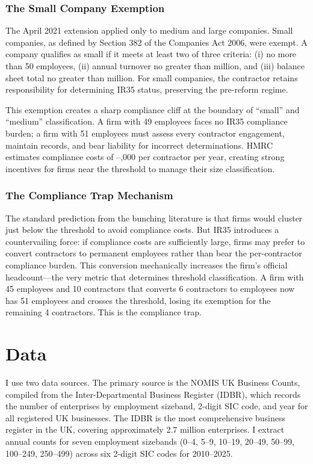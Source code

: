 \documentclass[12pt]{article}
\begin{document}
\subsubsection*{The Small Company Exemption} The April 2021 extension applied only to medium and large companies. Small companies, as defined by Section 382 of the Companies Act 2006, were exempt. A company qualifies as small if it meets at least two of three criteria: (i) no more than 50 employees, (ii) annual turnover no greater than  million, and (iii) balance sheet total no greater than  million. For small companies, the contractor retains responsibility for determining IR35 status, preserving the pre-reform regime.

This exemption creates a sharp compliance cliff at the boundary of ``small'' and ``medium'' classification. A firm with 49 employees faces no IR35 compliance burden; a firm with 51 employees must assess every contractor engagement, maintain records, and bear liability for incorrect determinations. HMRC estimates compliance costs of --,000 per contractor per year, creating strong incentives for firms near the threshold to manage their size classification.

\subsubsection*{The Compliance Trap Mechanism} The standard prediction from the bunching literature \citep{kleven2016bunching, saez2010taxpayers} is that firms would cluster just below the threshold to avoid compliance costs. But IR35 introduces a countervailing force: if compliance costs are sufficiently large, firms may prefer to convert contractors to permanent employees rather than bear the per-contractor compliance burden. This conversion mechanically increases the firm's official headcount---the very metric that determines threshold classification. A firm with 45 employees and 10 contractors that converts 6 contractors to employees now has 51 employees and crosses the threshold, losing its exemption for the remaining 4 contractors. This is the compliance trap.


\section{Data}

I use two data sources. The primary source is the NOMIS UK Business Counts, compiled from the Inter-Departmental Business Register (IDBR), which records the number of enterprises by employment sizeband, 2-digit SIC code, and year for all registered UK businesses. The IDBR is the most comprehensive business register in the UK, covering approximately 2.7 million enterprises. I extract annual counts for seven employment sizebands (0--4, 5--9, 10--19, 20--49, 50--99, 100--249, 250--499) across six 2-digit SIC codes for 2010--2025.
\end{document}
